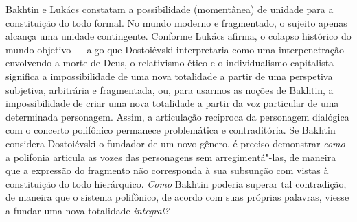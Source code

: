 Bakhtin e Lukács constatam a possibilidade (momentânea) de unidade para
a constituição do todo formal. No mundo moderno e fragmentado, o sujeito
apenas alcança uma unidade contingente. Conforme Lukács afirma, o
colapso histórico do mundo objetivo --- algo que Dostoiévski
interpretaria como uma interpenetração envolvendo a morte de Deus, o
relativismo ético e o individualismo capitalista --- significa a
impossibilidade de uma nova totalidade a partir de uma perspetiva
subjetiva, arbitrária e fragmentada, ou, para usarmos as noções de
Bakhtin, a impossibilidade de criar uma nova totalidade a partir da voz
particular de uma determinada personagem. Assim, a articulação recíproca
da personagem dialógica com o concerto polifônico permanece problemática
e contraditória. Se Bakhtin considera Dostoiévski o fundador de um novo
gênero, é preciso demonstrar \emph{como} a polifonia articula as vozes
das personagens sem arregimentá"-las, de maneira que a expressão do
fragmento não corresponda à sua subsunção com vistas à constituição do
todo hierárquico. \emph{Como} Bakhtin poderia superar tal contradição,
de maneira que o sistema polifônico, de acordo com suas próprias
palavras, viesse a fundar uma nova totalidade \emph{integral? }

